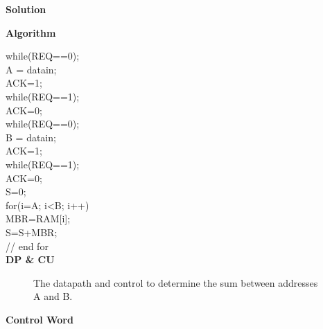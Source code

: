 \begin{enumerate}
        \begin{onlysolution}  \textbf{Solution} \itshape{

                \textbf{ Algorithm}

                while(REQ==0); \\
                A = datain; \\
                ACK=1; \\
                while(REQ==1); \\
                ACK=0; \\
                while(REQ==0); \\
                B = datain; \\
                ACK=1; \\
                while(REQ==1); \\
                ACK=0; \\
                S=0; \\
                for(i=A; i<B; i++)  { \\
                    MBR=RAM[i]; \\
                    S=S+MBR; \\
                } // end for \\

                \textbf{ DP \& CU}

                \begin{figure}[ht]
                    \caption{The datapath and control to determine the sum between
                    addresses A and B.}
                \end{figure}

                \textbf{ Control Word}

}
\end{onlysolution}
\end{enumerate}
